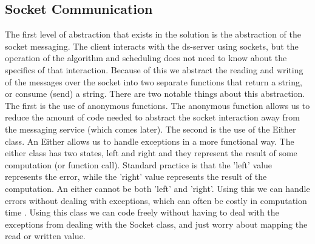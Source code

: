 \documentclass[a4paper]{article} %
\begin{document}
\subsection*{Socket Communication}
The first level of abstraction that exists in the solution is the abstraction of the socket messaging. 
The client interacts with the ds-server using sockets, but the operation of the algorithm and scheduling does not need to know about the specifics of that interaction.
\newline
Because of this we abstract the reading and writing of the messages over the socket into two separate functions that return a string, or consume (send) a string.
There are two notable things about this abstraction. The first is the use of anonymous functions.
The anonymous function allows us to reduce the amount of code needed to abstract the socket interaction away from the messaging service (which comes later). 
The second is the use of the Either class. An Either allows us to handle exceptions in a more functional way\cite{bly_2018}.
The either class has two states, left and right and they represent the result of some computation (or function call). 
Standard practice is that the 'left' value represents the error, while the 'right' value represents the result of the computation.
An either cannot be both 'left' and 'right'. Using this we can handle errors without dealing with exceptions, which can often be costly in computation time \cite{maurer_2013}. 
Using this class we can code freely without having to deal with the exceptions from dealing with the Socket class, and just worry about mapping the read or written value.
\end{document}
